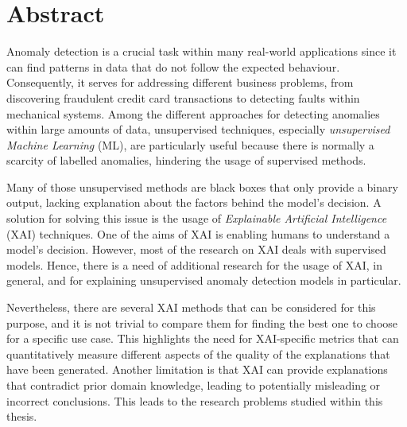 \vspace*{15em}

\chapter*{Abstract}

    
    Anomaly detection is a crucial task within many real-world applications since it can find patterns in data that do not follow the expected behaviour. Consequently, it serves for addressing different business problems, from discovering fraudulent credit card transactions to detecting faults within mechanical systems. Among the different approaches for detecting anomalies within large amounts of data, unsupervised techniques, especially \textit{unsupervised Machine Learning} (ML), are particularly useful because there is normally a scarcity of labelled anomalies, hindering the usage of supervised methods.
    
    Many of those unsupervised methods are black boxes that only provide a binary output, lacking explanation about the factors behind the model's decision. A solution for solving this issue is the usage of \textit{Explainable Artificial Intelligence} (XAI) techniques. One of the aims of XAI is enabling humans to understand a model's decision. However, most of the research on XAI deals with supervised models. Hence, there is a need of additional research for the usage of XAI, in general, and for explaining unsupervised anomaly detection models in particular.
    
    Nevertheless, there are several XAI methods that can be considered for this purpose, and it is not trivial to compare them for finding the best one to choose for a specific use case. This highlights the need for XAI-specific metrics that can quantitatively measure different aspects of the quality of the explanations that have been generated. Another limitation is that XAI can provide explanations that contradict prior domain knowledge, leading to potentially misleading or incorrect conclusions. This leads to the research problems studied within this thesis.

